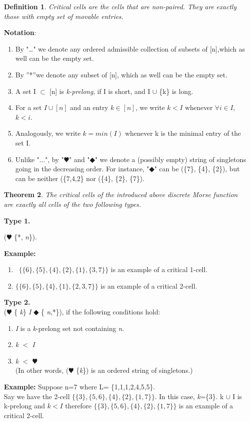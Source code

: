 \documentclass{amsart}
\newtheorem{theorem}{Theorem}[section]
\newtheorem{Definition}[theorem]{Definition}
\newenvironment{definition}{\begin{Definition}\normalfont}{\end{Definition}}
\begin{document}
\begin{definition}
\cite{PANZU}\textit{Critical cells} are the cells that are non-paired. They are exactly those with empty set of movable entries.
\end{definition}

\textbf{Notation}: 
\begin{enumerate}
\item By "\ldots " we denote any ordered admissible collection of subsets of [n],which as well can be the empty set.
\item By ''*''we denote any subset of [n], which as well can be the empty set.
\item A set I $\subset$ [n] is \textit{k-prelong}, if I is short, and I $\cup$ \{k\} is long.
\item For a set $I \cup [n]$ and an entry $k \in [n]$, we write $k  < I$ whenever $\forall i \in I$,  $k < i$. 
\item Analogously, we write $k=min(I)$ whenever k is the minimal entry of the set I.
\item Unlike "...", by "$\varheartsuit$" and "$\Diamondblack$" we denote a (possibly empty) string of singletons going in the decreasing order. For instance, "$\Diamondblack$" can be (\{7\}, \{4\}, \{2\}), but can be neither (\{7,4,2\} nor (\{4\}, \{2\}, \{7\}).
\end{enumerate} 


\begin{theorem}\cite{PANZU}
The critical cells of the introduced above discrete Morse function are exactly all cells of the two following types.
\end{theorem}

\textbf{Type 1.}
\begin{center}
($\varheartsuit$ \{*, \textit{n}\}).
\end{center}

\textbf{Example:}
\begin{enumerate}
\item \ $\{\{6\},\{5\},\{4\},\{2\},\{1\},\{3,7\}\}$ is an example of a critical 1-cell.
\item$\{\{6\},\{5\},\{4\},\{1\},\{2,3,7\}\}$ is an example of a critical 2-cell.
\end{enumerate}
\textbf{Type 2.}\\
\indent\indent($\varheartsuit$ \{ \textit{k}\} \textit{I} $\Diamondblack$ \{ \textit{n},*\}), if the following conditions hold: 
\begin{enumerate}
\item \textit{I} is a \textit{k}-prelong set not containing \textit{n}.
\item \textit{k} $<$ \textit{I}
\item \textit{k} $<$ $\varheartsuit$\\
(In other words, ($\varheartsuit$ \{\textit{k}\}) is an ordered string of singletons.)
\end{enumerate}
\textbf{Example:} Suppose n=7 where L= \{1,1,1,2,4,5,5\}.\\
Say we have the 2-cell $\{\{3\},\{5,6\},\{4\},\{2\},\{1,7\}\}$. In this case, \textit{k}=\{3\}. k $\cup$ I is k-prelong and $k<I$ therefore $\{\{3\},\{5,6\},\{4\},\{2\},\{1,7\}\}$ is an example of a critical 2-cell.  \\
\end{document}
